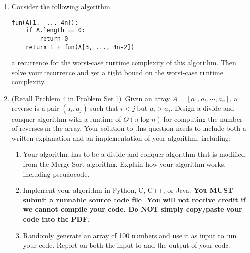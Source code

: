 \documentclass[12pt]{article}
\begin{document}
\begin{enumerate}
\begin{enumerate}
\end{enumerate}

\pagebreak

\item \label{3} Consider the following algorithm

\begin{verbatim}
fun(A[1, ..., 4n]):
    if A.length == 0:
        return 0
    return 1 + fun(A[3, ..., 4n-2])
\end{verbatim}

 a recurrence for the worst-case runtime complexity of this algorithm. Then {solve} your recurrence and get a tight bound on the worst-case runtime complexity.


\pagebreak


\item \label{4} (Recall Problem 4 in Problem Set 1)~Given an array $A = [a_1, a_2, \cdots, a_n]$, a reverse is a pair $(a_i, a_j)$ such  that $i< j$ but $a_i > a_j$. Design a divide-and-conquer algorithm with a runtime of $O(n\log n)$ for computing the number of reverses in the array. Your solution to this question needs to include both a written explanation and an implementation of your algorithm, including:

\begin{enumerate}
\item \label{qs:a} Your algorithm has to be a divide and conquer algorithm that is modified from the Merge Sort algorithm. Explain how your algorithm works, including pseudocode. 
\item \label{qs:b} Implement your algorithm in Python, C, C++, or Java. \textbf{You MUST submit a runnable source code file. You will not receive credit if we cannot compile your code. Do NOT simply copy/paste your code into the PDF. }
\item \label{qs:c} Randomly generate an array of 100 numbers and use it as input to run your code. Report on both the input to and the output of your code.
\end{enumerate}




\end{enumerate}
\end{document}
